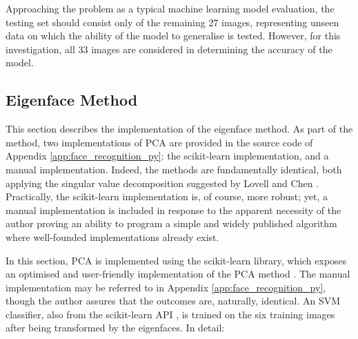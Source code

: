 Approaching the problem as a typical machine learning model evaluation, the testing set should consist only of the remaining 27 images, representing unseen data on which the ability of the model to generalise is tested. However, for this investigation, all 33 images are considered in determining the accuracy of the model.

\subsection{Eigenface Method}

This section describes the implementation of the eigenface method. As part of the method, two implementations of PCA are provided in the source code of Appendix \ref{app:face_recognition_py}: the scikit-learn implementation, and a manual implementation. Indeed, the methods are fundamentally identical, both \cite{sklearn_2023} applying the singular value decomposition suggested by Lovell and Chen \cite{lovell_2008}. Practically, the scikit-learn implementation is, of course, more robust; yet, a manual implementation is included in response to the apparent necessity of the author proving an ability to program a simple and widely published algorithm where well-founded implementations already exist.

In this section, PCA is implemented using the scikit-learn library, which exposes an optimised and user-friendly implementation of the PCA method \cite{sklearn_2023}. The manual implementation may be referred to in Appendix \ref{app:face_recognition_py}, though the author assures that the outcomes are, naturally, identical. An SVM classifier, also from the scikit-learn API \cite{sklearn_2023b}, is trained on the six training images after being transformed by the eigenfaces. In detail:

